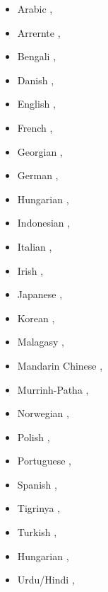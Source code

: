 \begin{itemize}
\item Arabic \citep{Attia2008a-u},
\item Arrernte \citep*{Dras2012a-u},
\item Bengali \citep{SC97a-u},
\item Danish \citep{Oersnes2002b-u,OW2003a-u,OW2004a-u},
\item English \citep*{HHP91a-u,BDFK99a-u,RKKCMJ2002a-u,KM2007a-u},
\item French \citep*{Zweigenbaum91a-u,Frank96b-u,FZ2002a-u,BDFK99a-u,CK2001a-u,BSL2005a-u,SdA2016a-u,Alencar2017a-u},
%
%
\item Georgian \citep{Meurer2009a-u},
\item German \citep{Rohrer96a,Berman96a-u,KR97a-u,BDFK99a-u,Dipper2003a-u,RF2006a,Forst2006a-u,Frank2002b-u,FR2009a-u},
\item Hungarian \citep{LRT2010a-u},
\item Indonesian \citep*{AADMS2009a-u},
\item Italian \citep*{Delmonte90a-u,Mayo99a-u,Quaglia2012a-u},
\item Irish \citep{Sulger2009a-u,Sulger2010a-u},
\item Japanese \citep*{HHP91a-u,MO2003a-u,Umemoto2006a-u},
\item Korean \citep*{HHP91a-u},
\item Malagasy \citep*{Randriamasimanana2006a-u,DLM2006a-u},
\item Mandarin Chinese \citep*{HHP91a-u,FK2007a-u},
\item Murrinh-Patha \citep{SN2012a-u},
\item Norwegian \citep*{DMR2005a},
\item Polish \citep*{PP2012a-u},
\item Portuguese \citep{Alencar2004a-u,Alencar2013a-u,Alencar2015a-u},

\item Spanish \citep{Mayo99a-u},
%
\item Tigrinya \citep{Kifle2012a-u},
\item Turkish \citep{CO2006a-u},
\item Hungarian \citep*{LRT2010a-u,RLC2011a-u},
\item Urdu/Hindi \citep*{BHKR2007a-u,BBS2008a-u},


\end{itemize}
